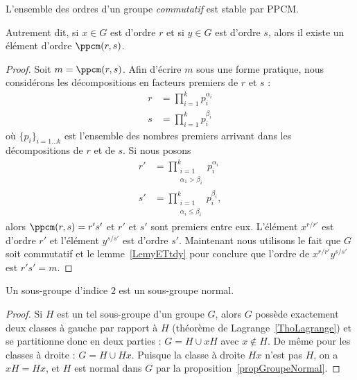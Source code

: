 \begin{lemma}       \label{LemqAUBYn}
    L'ensemble des ordres d'un groupe \emph{commutatif} est stable par PPCM.

    Autrement dit, si \( x\in G\) est d'ordre \( r\) et si \( y\in G\) est d'ordre \( s\), alors il existe un élément d'ordre \( \ppcm(r,s)\).
\end{lemma}

\begin{proof}
    Soit \( m=\ppcm(r,s)\). Afin d'écrire \( m\) sous une forme pratique, nous considérons les décompositions en facteurs premiers de \( r\) et \( s\) :
    \begin{subequations}
        \begin{align}
            r&=\prod_{i=1}^kp_i^{\alpha_i}\\
            s&=\prod_{i=1}^kp_i^{\beta_i}
        \end{align}
    \end{subequations}
    où \( \{ p_i \}_{i=1\ldots k}\) est l'ensemble des nombres premiers arrivant dans les décompositions de \( r\) et de \( s\). Si nous posons
    \begin{subequations}
        \begin{align}
            r'&=\prod_{\substack{i=1\\\alpha_1>\beta_i}}^kp_i^{\alpha_i}\\
            s'&=\prod_{\substack{i=1\\\alpha_i\leq \beta_i}}^kp_i^{\beta_i},
        \end{align}
    \end{subequations}
    alors \( \ppcm(r,s)=r's'\) et \( r'\) et \( s'\) sont premiers entre eux. L'élément \( x^{r/r'}\) est d'ordre \( r'\) et l'élément \( y^{s/s'}\) est d'ordre \( s'\). Maintenant nous utilisons le fait que \( G\) soit commutatif et le lemme~\ref{LemyETtdy} pour conclure que l'ordre de \( x^{r/r'}y^{s/s'}\) est \( r's'=m\).
\end{proof}

\begin{lemma}    \label{LemSkIOOG}
    Un sous-groupe d'indice \( 2\) est un sous-groupe normal.
\end{lemma}

\begin{proof}
    Si $H$ est un tel sous-groupe d'un groupe $G$, alors $G$ possède exactement deux classes à gauche par rapport à \( H\) (théorème de Lagrange~\ref{ThoLagrange}) et se partitionne donc en deux parties : \( G=H\cup xH\) avec \( x \notin H \). De même pour les classes à droite : \( G=H\cup Hx\). Puisque la classe à droite \( Hx \) n'est pas $H$, on a \( xH = Hx \), et $H$ est normal dans $G$ par la proposition~\ref{propGroupeNormal}.
\end{proof}


